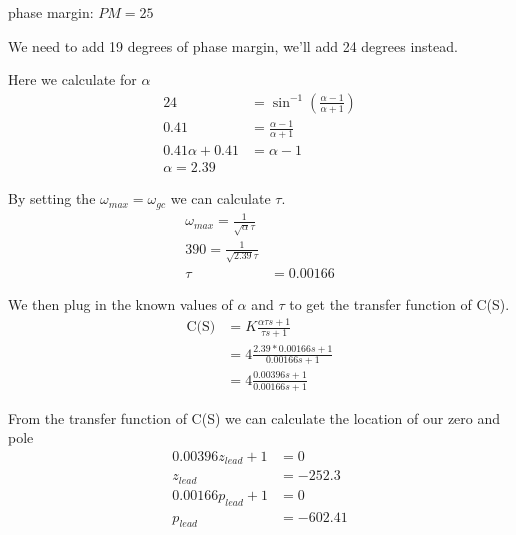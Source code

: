 \documentclass{article}
\begin{document}
phase margin: $PM = 25$

We need to add 19 degrees of phase margin, we'll add 24 degrees instead.

Here we calculate for $\alpha$
\begin{align*}
24 &= \sin^{-1}(\frac{\alpha - 1}{\alpha + 1})\\
0.41 &= \frac{\alpha - 1}{\alpha + 1}\\
0.41\alpha + 0.41 &= \alpha - 1\\
\alpha = 2.39
\end{align*}

By setting the $\omega_{max} = \omega_{gc}$ we can calculate $\tau$.
\begin{align*}
\omega_{max} = \frac{1}{\sqrt{\alpha}\tau}\\
390 = \frac{1}{\sqrt{2.39}\tau}\\
\tau &= 0.00166
\end{align*}

We then plug in the known values of $\alpha$ and $\tau$ to get the transfer function of C(S).
\begin{align*}
\text{C(S)} &= K\frac{\alpha\tau s + 1}{\tau s + 1}\\
    &= 4\frac{2.39 * 0.00166 s + 1}{0.00166 s + 1}\\
    &= 4\frac{0.00396 s + 1}{0.00166 s + 1}
\end{align*}

From the transfer function of C(S) we can calculate the location of our zero and pole
\begin{align*}
0.00396z_{lead} + 1 &= 0\\
z_{lead} &= -252.3\\
0.00166p_{lead} + 1 &= 0\\
p_{lead} &= -602.41\\
\end{align*}

\end{document}
